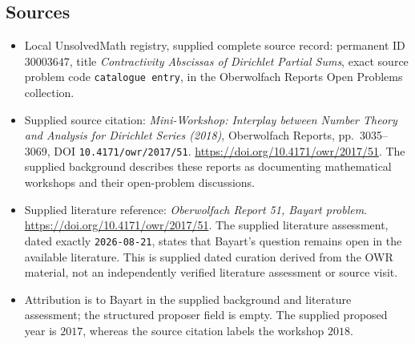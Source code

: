 \documentclass[11pt]{article}
\begin{document}
\subsection{Sources}
\begin{itemize}
\item Local UnsolvedMath registry, supplied complete source record: permanent ID \(30003647\), title \emph{Contractivity Abscissas of Dirichlet Partial Sums}, exact source problem code \texttt{catalogue entry}, in the Oberwolfach Reports Open Problems collection.
\item Supplied source citation: \emph{Mini-Workshop: Interplay between Number Theory and Analysis for Dirichlet Series (2018)}, Oberwolfach Reports, pp.\ 3035--3069, DOI \texttt{10.4171/owr/2017/51}. \url{https://doi.org/10.4171/owr/2017/51}. The supplied background describes these reports as documenting mathematical workshops and their open-problem discussions.
\item Supplied literature reference: \emph{Oberwolfach Report 51, Bayart problem}. \url{https://doi.org/10.4171/owr/2017/51}. The supplied literature assessment, dated exactly \texttt{2026-08-21}, states that Bayart's question remains open in the available literature. This is supplied dated curation derived from the OWR material, not an independently verified literature assessment or source visit.
\item Attribution is to Bayart in the supplied background and literature assessment; the structured proposer field is empty. The supplied proposed year is \(2017\), whereas the source citation labels the workshop \(2018\).
\end{itemize}
\end{document}
